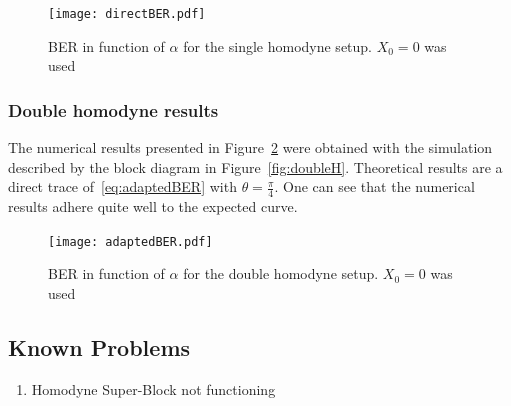 \begin{figure}[h]
\centering
\texttt{[image: directBER.pdf]}
\caption{BER in function of $\alpha$ for the single homodyne setup. $X_0=0$ was used}
\label{fig:directber}
\end{figure}

\subsubsection*{Double homodyne results}\label{subsec:DHresults}

The numerical results presented in Figure~\ref{fig:adaptedber} were obtained with the simulation described by the block diagram in Figure~\ref{fig:doubleH}. Theoretical results are a direct trace of~\eqref{eq:adaptedBER} with $\theta=\frac{\pi}{4}$. One can see that the numerical results adhere quite well to the expected curve.

\begin{figure}[h]
\centering
\texttt{[image: adaptedBER.pdf]}
\caption{BER in function of $\alpha$ for the double homodyne setup. $X_0=0$ was used}
\label{fig:adaptedber}
\end{figure}

%
%
%
%
%
%
%
%
%
%
%
%
%

\subsection*{Known Problems}
\begin{enumerate}
    \item Homodyne Super-Block not functioning
\end{enumerate}



 


